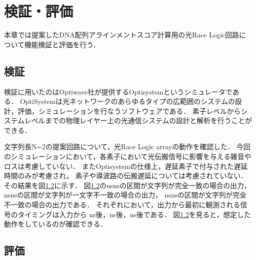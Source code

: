 \chapter{検証・評価}
本章では提案したDNA配列アラインメントスコア計算用の光Race Logic回路について機能検証と評価を行う．
\section{検証}
検証に用いたのはOptiwave社が提供するOptisystemというシミュレータである．
OptiSystemは光ネットワークのあらゆるタイプの広範囲のシステムの設計，評価，シミュレーションを行なうソフトウェアである．
素子レベルからシステムレベルまでの物理レイヤー上の光通信システムの設計と解析を行うことができる．

文字列長N=2の提案回路について，光Race Logic arrayの動作を確認した．
今回のシミュレーションにおいて，各素子において光伝搬信号に影響を与える雑音やロスは考慮していない．
またOptisystemの仕様上，遅延素子で付与された遅延時間のみが考慮され，
素子や導波路の伝搬遅延については考慮されていない．
その結果を図\ref{}に示す．
図\ref{}のnsnsの区間が文字列が完全一致の場合の出力，
nsnsの区間が文字列が一文字不一致の場合の出力，
nsnsの区間が文字列が完全不一致の場合の出力である．
それぞれにおいて，出力から最初に観測される信号のタイミングは入力から
ns後，ns後，ns後である．
図\ref{}を見ると，想定した動作をしているのが確認できる．

\section{評価}

